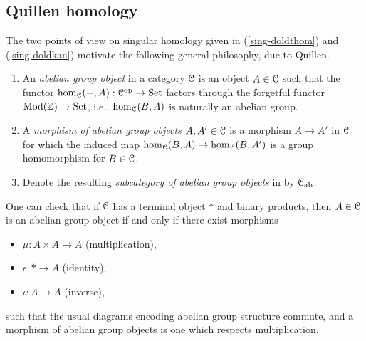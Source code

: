 \subsection{Quillen homology}
\label{quillenhom}

The two points of view on singular homology given in
(\ref{sing-doldthom}) and (\ref{sing-doldkan}) motivate the following
general philosophy, due to Quillen.

\begin{definitions}
  \begin{enumerate}[leftmargin=*]
  \item An \emph{abelian group object} in a category $\mathcal{C}$ is an object $A
    \in \mathcal{C}$ such that the functor $\operatorname{hom}_{\mathcal{C}}(-,A) : \mathcal{C}^{\mathrm{op}} \to \mathrm{Set}$
    factors through the forgetful functor $\mathrm{Mod}(\mathbb{Z}) \to \mathrm{Set}$, i.e.,
    $\operatorname{hom}_{\mathcal{C}}(B,A)$ is naturally an abelian group.
  \item A \emph{morphism of abelian group objects} $A,A' \in \mathcal{C}$ is a
    morphism $A \to A'$ in $\mathcal{C}$ for which the induced map $\operatorname{hom}_{\mathcal{C}}(B,A)
    \to \operatorname{hom}_{\mathcal{C}}(B,A')$ is a group homomorphism for $B \in \mathcal{C}$.
  \item Denote the resulting \emph{subcategory of abelian group
    objects} in by $\mathcal{C}_{\operatorname{ab}}$.
  \end{enumerate}
\end{definitions}

\begin{nothing}
  \label{abgpob-mult}
  One can check that if $\mathcal{C}$ has a terminal object $*$ and binary
  products, then $A \in \mathcal{C}$ is an abelian group object if and only if
  there exist morphisms
  \begin{itemize}
  \item $\mu : A \times A \to A$ (multiplication),
  \item $\epsilon : * \to A$ (identity),
  \item $\iota : A \to A$ (inverse),
  \end{itemize}
  such that the usual diagrams encoding abelian group structure
  commute, and a morphism of abelian group objects is one which
  respects multiplication.
\end{nothing}

